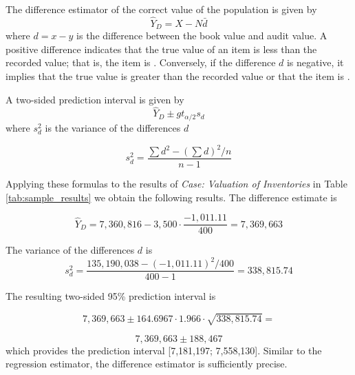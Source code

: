 \bigskip
The difference estimator of the correct value of the population is given by
\begin{equation}
\hat{Y}_D = X - N \bar{d}
\label{eq:difference_estimate}
\end{equation}
where $d = x - y$ is the difference between the book value and audit value. A positive difference indicates that the true value of an item is less than the recorded value; that is, the item is . Conversely, if the difference $d$ is negative, it implies that the true value is greater than the recorded value or that the item is .

\bigskip
A two-sided prediction interval is given by
\begin{equation}
  \hat{Y}_D \pm g t_{\alpha/2} s_d
\end{equation}
where $s_d^2$ is the variance of the differences $d$

\begin{equation}
s_d^2 = \frac{\sum{d^2} - (\sum{d})^2/n}{n - 1}
\label{eq:sd_diff}
\end{equation}

\bigskip
Applying these formulas to the results of \emph{Case: Valuation of Inventories} in Table \ref{tab:sample_results} we obtain the following results. The difference estimate is

\begin{equation*}
\hat{Y}_D = 7,360,816 - 3,500 \cdot \frac{-1,011.11}{400} = 7,369,663
\end{equation*}

The variance of the differences $d$ is
\begin{equation*}
s_d^2 = \frac{135,190,038 - (-1,011.11)^2 / 400}{400 - 1} = 338,815.74
\end{equation*}

The resulting two-sided 95\% prediction interval is

\begin{equation*}
  7,369,663 \pm 164.6967 \cdot 1.966 \cdot \sqrt{338,815.74} =
\end{equation*}

\begin{equation*}
  7,369,663 \pm 188,467 
\end{equation*}
which provides the prediction interval [7,181,197; 7,558,130]. Similar to the regression estimator, the difference estimator is sufficiently precise.

